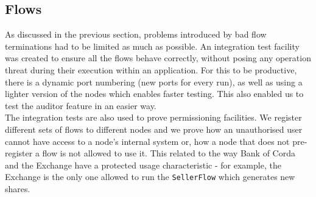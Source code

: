 \documentclass[12pt,twoside]{article}
\begin{document}
\subsection{Flows}
\label{sub:Flows}
As discussed in the previous section, problems introduced by bad flow terminations had to be limited as much as possible. An integration test facility was created to ensure all the flows behave correctly, without posing any operation threat during their execution within an application. For this to be productive, there is a dynamic port numbering (new ports for every run), as well as using a lighter version of the nodes which enables faster testing. This also enabled us to test the auditor feature in an easier way.
\\
The integration tests are also used to prove permissioning facilities. We register different sets of flows to different nodes and we prove how an unauthorised user cannot have access to a node's internal system or, how a node that does not pre-register a flow is not allowed to use it. This related to the way Bank of Corda and the Exchange have a protected usage characteristic - for example, the Exchange is the only one allowed to run the \verb|SellerFlow| which generates new shares.
\end{document}
